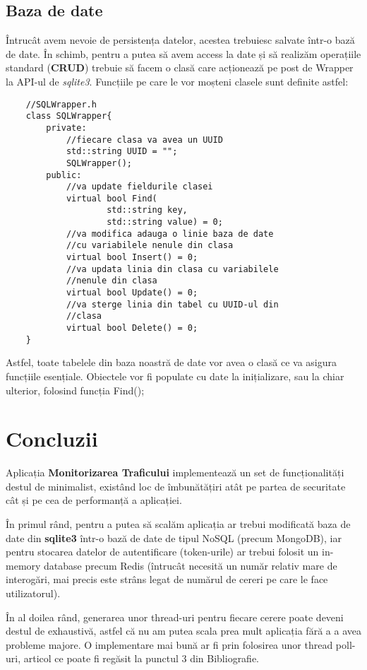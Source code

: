 \documentclass{article}
\begin{document}
\subsection{Baza de date}
Întrucât avem nevoie de persistența datelor, acestea trebuiesc salvate într-o bază de date. În schimb, pentru a putea să avem access la date și să realizăm operațiile standard (\textbf{CRUD}) trebuie să facem o clasă care acționează pe post de Wrapper la API-ul de \textit{sqlite3}. Funcțiile pe care le vor moșteni clasele sunt definite astfel:

\begin{lstlisting}
    //SQLWrapper.h
    class SQLWrapper{
        private:
            //fiecare clasa va avea un UUID
            std::string UUID = "";
            SQLWrapper();
        public:
            //va update fieldurile clasei
            virtual bool Find(
                    std::string key, 
                    std::string value) = 0;
            //va modifica adauga o linie baza de date 
            //cu variabilele nenule din clasa
            virtual bool Insert() = 0;
            //va updata linia din clasa cu variabilele
            //nenule din clasa
            virtual bool Update() = 0;
            //va sterge linia din tabel cu UUID-ul din 
            //clasa
            virtual bool Delete() = 0;            
    }
\end{lstlisting}

Astfel, toate tabelele din baza noastră de date vor avea o clasă ce va asigura funcțiile esențiale. Obiectele vor fi populate cu date la inițializare, sau la chiar ulterior, folosind funcția Find();

\section{Concluzii}
Aplicația \textbf{Monitorizarea Traficului} implementează un set de funcționalități destul de minimalist, existând loc de îmbunătățiri atât pe partea de securitate cât și pe cea de performanță a aplicației. 

În primul rând, pentru a putea să scalăm aplicația ar trebui modificată baza de date din \textbf{sqlite3} într-o bază de date de tipul NoSQL (precum MongoDB), iar pentru stocarea datelor de autentificare (token-urile) ar trebui folosit un in-memory database precum Redis (întrucât necesită un număr relativ mare de interogări, mai precis este strâns legat de numărul de cereri pe care le face utilizatorul).

În al doilea rând, generarea unor thread-uri pentru fiecare cerere poate deveni destul de exhaustivă, astfel că nu am putea scala prea mult aplicația fără a a avea probleme majore. O implementare mai bună ar fi prin folosirea unor thread poll-uri, articol ce poate fi regăsit la punctul 3 din Bibliografie. 
\end{document}
